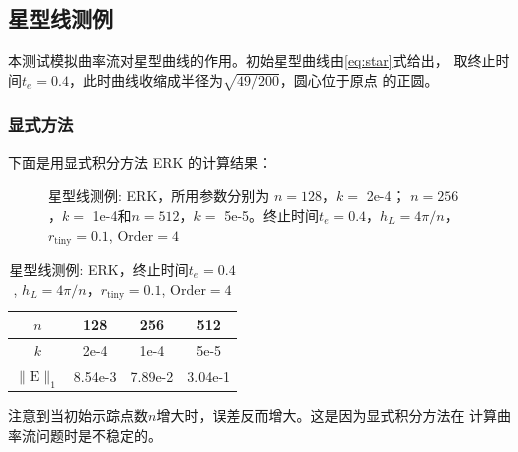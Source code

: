 \documentclass[a4paper,twoside]{ctexart}
\begin{document}
  \subsection{星型线测例}

本测试模拟曲率流对星型曲线的作用。初始星型曲线由\eqref{eq:star}式给出，
取终止时间$t_e=0.4$，此时曲线收缩成半径为$\sqrt{49/200}$，圆心位于原点
的正圆。
\subsubsection{显式方法}
下面是用显式积分方法 ERK 的计算结果：
\begin{figure}[H]
	\centering  %
    \caption{星型线测例: ERK，所用参数分别为 $n=128$，$k=$ 2e-4；
      $n=256$，$k=$ 1e-4和$n=512$，$k=$ 5e-5。终止时间$t_e = 0.4$，$h_L=4\pi/n$，$r_{\text{tiny}}=0.1$,
      $\text{Order} = 4$}
    \label{fig:star1}
\end{figure}
\begin{table}[htbp]
    \centering\begin{tabular}{c|ccc}
        \hline
         $n$&128&256&512\\
                \hline
         $k$&2e-4&1e-4&5e-5\\
        \hline
        $\|\mathrm{E}\|_1$&8.54e-3&7.89e-2&3.04e-1\\
        \hline
      \end{tabular}
    \caption{星型线测例: ERK，终止时间$t_e = 0.4$, $h_L=4\pi/n$，$r_{\text{tiny}}=0.1$,
      $\text{Order} = 4$}
    \label{tab:star1}
  \end{table}
  注意到当初始示踪点数$n$增大时，误差反而增大。这是因为显式积分方法在
  计算曲率流问题时是不稳定的。
\end{document}
